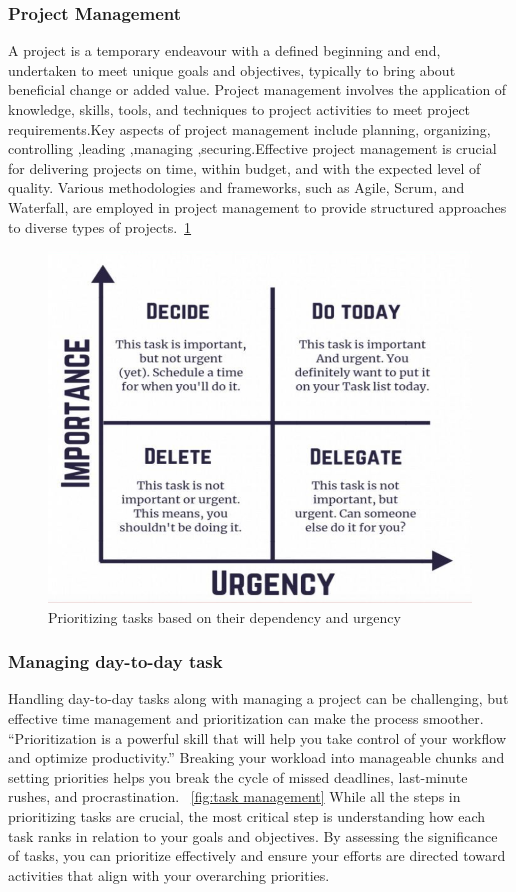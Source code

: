 \documentclass{chart}
\begin{document}
\subsubsection{Project Management}
\hspace{1cm}A project is a temporary endeavour with a defined beginning and end, undertaken to meet unique goals and objectives, typically to bring about beneficial change or added value. Project management involves the application of knowledge, skills, tools, and techniques to project activities to meet project requirements.Key aspects of project management include planning, organizing, controlling ,leading ,managing ,securing.Effective project management is crucial for delivering projects on time, within budget, and with the expected level of quality. Various methodologies and frameworks, such as Agile, Scrum, and Waterfall, are employed in project management to provide structured approaches to diverse types of projects.~\cref{fig:project management} 
 
\begin{figure}
	\centering
	\includegraphics[width=0.45\linewidth]{Fig1}
	\caption{Prioritizing tasks based on their dependency and urgency} 
	\label{fig:project management}
\end{figure}

\subsubsection{ Managing day-to-day task}
\hspace{1cm}Handling day-to-day tasks along with managing a project can be challenging, but effective time management and prioritization can make the process smoother. “Prioritization is a powerful skill that will help you take control of your workflow and optimize productivity.” Breaking your workload into manageable chunks and setting priorities helps you break the cycle of missed deadlines, last-minute rushes, and procrastination. ~\cref{fig:task management} While all the steps in prioritizing tasks are crucial, the most critical step is understanding how each task ranks in relation to your goals and objectives. By assessing the significance of tasks, you can prioritize effectively and ensure your efforts are directed toward activities that align with your overarching priorities.
 
\end{document}
